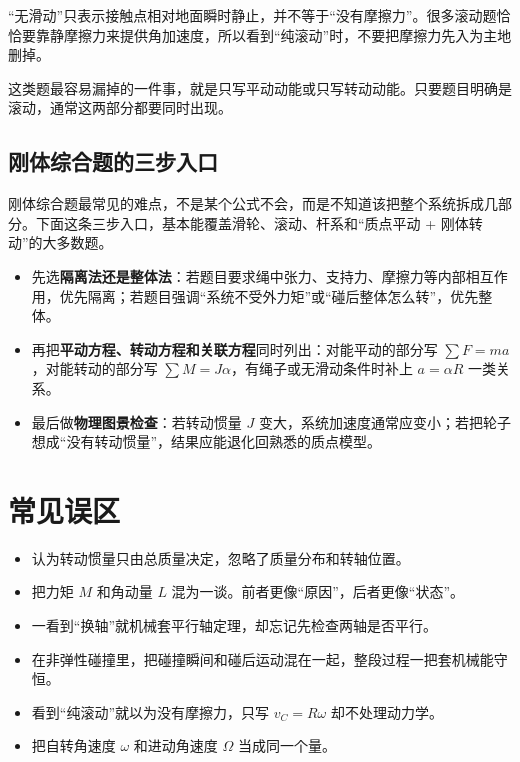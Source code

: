 \documentclass[lang=cn,11pt]{elegantbook}
\newcommand{\bridge}[1]{\begin{note}#1\end{note}}
\begin{document}
\bridge{“无滑动”只表示接触点相对地面瞬时静止，并不等于“没有摩擦力”。很多滚动题恰恰要靠静摩擦力来提供角加速度，所以看到“纯滚动”时，不要把摩擦力先入为主地删掉。}

\begin{note}
这类题最容易漏掉的一件事，就是只写平动动能或只写转动动能。只要题目明确是滚动，通常这两部分都要同时出现。
\end{note}

\subsection{刚体综合题的三步入口}

刚体综合题最常见的难点，不是某个公式不会，而是不知道该把整个系统拆成几部分。下面这条三步入口，基本能覆盖滑轮、滚动、杆系和“质点平动 + 刚体转动”的大多数题。

\begin{itemize}
  \item 先选\textbf{隔离法还是整体法}：若题目要求绳中张力、支持力、摩擦力等内部相互作用，优先隔离；若题目强调“系统不受外力矩”或“碰后整体怎么转”，优先整体。
  \item 再把\textbf{平动方程、转动方程和关联方程}同时列出：对能平动的部分写 \(\sum F=ma\)，对能转动的部分写 \(\sum M=J\alpha\)，有绳子或无滑动条件时补上 \(a=\alpha R\) 一类关系。
  \item 最后做\textbf{物理图景检查}：若转动惯量 \(J\) 变大，系统加速度通常应变小；若把轮子想成“没有转动惯量”，结果应能退化回熟悉的质点模型。
\end{itemize}

\section{常见误区}

\begin{itemize}
  \item 认为转动惯量只由总质量决定，忽略了质量分布和转轴位置。
  \item 把力矩 \(M\) 和角动量 \(L\) 混为一谈。前者更像“原因”，后者更像“状态”。
  \item 一看到“换轴”就机械套平行轴定理，却忘记先检查两轴是否平行。
  \item 在非弹性碰撞里，把碰撞瞬间和碰后运动混在一起，整段过程一把套机械能守恒。
  \item 看到“纯滚动”就以为没有摩擦力，只写 \(v_C=R\omega\) 却不处理动力学。
  \item 把自转角速度 \(\omega\) 和进动角速度 \(\Omega\) 当成同一个量。
\end{itemize}
\end{document}
